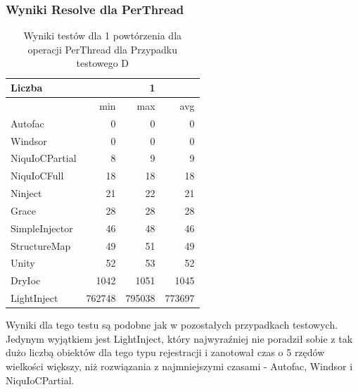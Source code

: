 \documentclass[12pt]{article}
\begin{document}
\subsubsection{Wyniki Resolve dla PerThread}
\begin{table}[H]
\captionsetup{belowskip=0pt,aboveskip=0pt}
\begin{center}
\begin{small}
	\begin{tabular}{ | l | r r r | }
    		\hline
Liczba & & 1 & \\ \hline
 & min & max & avg \\ \hline
Autofac & 0 & 0 & 0 \\ \hline
Windsor & 0 & 0 & 0 \\ \hline
NiquIoCPartial & 8 & 9 & 9 \\ \hline
NiquIoCFull & 18 & 18 & 18 \\ \hline
Ninject & 21 & 22 & 21 \\ \hline
Grace & 28 & 28 & 28 \\ \hline
SimpleInjector & 46 & 48 & 46 \\ \hline
StructureMap & 49 & 51 & 49 \\ \hline
Unity & 52 & 53 & 52 \\ \hline
DryIoc & 1042 & 1051 & 1045 \\ \hline
LightInject & 762748 & 795038 & 773697 \\ \hline
  	\end{tabular}
\end{small}
\end{center}
\caption{Wyniki testów dla 1 powtórzenia dla operacji PerThread dla Przypadku testowego D}
\label{TestCaseD_PerThread1}
\end{table}
Wyniki dla tego testu są podobne jak w pozostałych przypadkach testowych. Jedynym wyjątkiem jest LightInject, który najwyraźniej nie poradził sobie z tak dużo liczbą obiektów dla tego typu rejestracji i zanotował czas o 5 rzędów wielkości większy, niż rozwiązania z najmniejszymi czasami - Autofac, Windsor i NiquIoCPartial.
\\ \\
\end{document}
